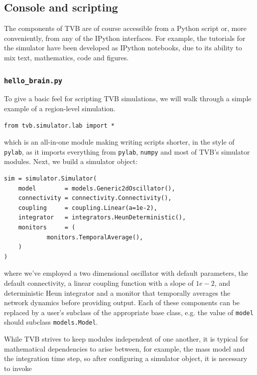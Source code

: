 \subsection{Console and scripting}

The components of TVB are of course accessible from a Python
script or, more conveniently, from any of the IPython interfaces.
For example, the tutorials for the simulator have been developed
as IPython notebooks, due to its ability to mix text, mathematics,
code and figures. 

\subsubsection{\texttt{hello\_brain.py}}

To give a basic feel for scripting TVB simulations, we will 
walk through a simple example of a region-level simulation.

\begin{lstlisting}
from tvb.simulator.lab import *
\end{lstlisting}

\noindent which is an all-in-one module making writing scripts
shorter, in the style of \texttt{pylab}, as it imports everything
from \texttt{pylab}, \texttt{numpy} and most of TVB's simulator
modules. Next, we build a simulator object:

\begin{lstlisting}
sim = simulator.Simulator(
    model        = models.Generic2dOscillator(), 
    connectivity = connectivity.Connectivity(),
    coupling     = coupling.Linear(a=1e-2),
    integrator   = integrators.HeunDeterministic(),
    monitors     = (
            monitors.TemporalAverage(), 
    )
)
\end{lstlisting}

\noindent where we've employed a two dimensional oscillator
with default parameters, the default connectivity, a linear 
coupling function with a slope of $1e-2$, and deterministic
Heun integrator and a monitor that temporally averages the 
network dynamics before providing output. Each of these
components can be replaced by a user's subclass of the
appropriate base class, e.g. the value of \texttt{model}
should subclass \texttt{models.Model}.

While TVB strives to keep modules independent of one another,
it is typical for mathematical dependencies to arise between, 
for example, the mass model and the integration time step, so
after configuring a simulator object, it is necessary to invoke

